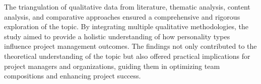 \documentclass[a4Paper]{article}
\begin{document}
The triangulation of qualitative data from literature, thematic analysis, content analysis, and comparative approaches ensured a comprehensive and rigorous exploration of the topic. By integrating multiple qualitative methodologies, the study aimed to provide a holistic understanding of how personality types influence project management outcomes. The findings not only contributed to the theoretical understanding of the topic but also offered practical implications for project managers and organizations, guiding them in optimizing team compositions and enhancing project success.

\pagebreak

\pagebreak
\end{document}
